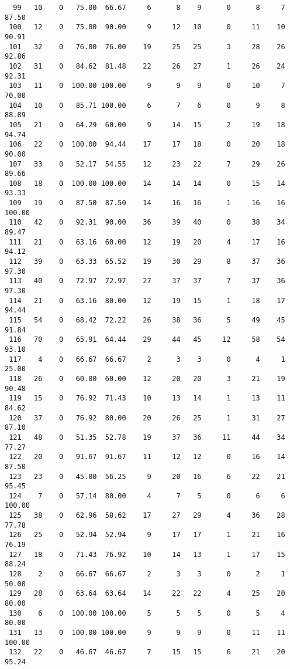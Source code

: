 \begin{verbatim}
  99   10    0   75.00  66.67     6      8    9      0      8     7    87.50
 100   12    0   75.00  90.00     9     12   10      0     11    10    90.91
 101   32    0   76.00  76.00    19     25   25      3     28    26    92.86
 102   31    0   84.62  81.48    22     26   27      1     26    24    92.31
 103   11    0  100.00 100.00     9      9    9      0     10     7    70.00
 104   10    0   85.71 100.00     6      7    6      0      9     8    88.89
 105   21    0   64.29  60.00     9     14   15      2     19    18    94.74
 106   22    0  100.00  94.44    17     17   18      0     20    18    90.00
 107   33    0   52.17  54.55    12     23   22      7     29    26    89.66
 108   18    0  100.00 100.00    14     14   14      0     15    14    93.33
 109   19    0   87.50  87.50    14     16   16      1     16    16   100.00
 110   42    0   92.31  90.00    36     39   40      0     38    34    89.47
 111   21    0   63.16  60.00    12     19   20      4     17    16    94.12
 112   39    0   63.33  65.52    19     30   29      8     37    36    97.30
 113   40    0   72.97  72.97    27     37   37      7     37    36    97.30
 114   21    0   63.16  80.00    12     19   15      1     18    17    94.44
 115   54    0   68.42  72.22    26     38   36      5     49    45    91.84
 116   70    0   65.91  64.44    29     44   45     12     58    54    93.10
 117    4    0   66.67  66.67     2      3    3      0      4     1    25.00
 118   26    0   60.00  60.00    12     20   20      3     21    19    90.48
 119   15    0   76.92  71.43    10     13   14      1     13    11    84.62
 120   37    0   76.92  80.00    20     26   25      1     31    27    87.10
 121   48    0   51.35  52.78    19     37   36     11     44    34    77.27
 122   20    0   91.67  91.67    11     12   12      0     16    14    87.50
 123   23    0   45.00  56.25     9     20   16      6     22    21    95.45
 124    7    0   57.14  80.00     4      7    5      0      6     6   100.00
 125   38    0   62.96  58.62    17     27   29      4     36    28    77.78
 126   25    0   52.94  52.94     9     17   17      1     21    16    76.19
 127   18    0   71.43  76.92    10     14   13      1     17    15    88.24
 128    2    0   66.67  66.67     2      3    3      0      2     1    50.00
 129   28    0   63.64  63.64    14     22   22      4     25    20    80.00
 130    6    0  100.00 100.00     5      5    5      0      5     4    80.00
 131   13    0  100.00 100.00     9      9    9      0     11    11   100.00
 132   22    0   46.67  46.67     7     15   15      6     21    20    95.24

\end{verbatim}
